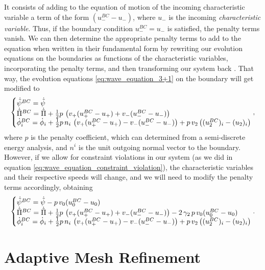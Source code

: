 It consists of adding to the equation of motion of the incoming characteristic variable a term of the form $(u_-^{BC}  - u_-)$, where $u_-$ is the incoming \textit{characteristic variable}. Thus, if the boundary condition $u_-^{BC} = u_-$ is satisfied, the penalty terms vanish. We can then determine the appropriate penalty terms to add to the equation when written in their fundamental form by rewriting our evolution equations on the boundaries as functions of the characteristic variables, incorporating the penalty terms, and then transforming our system back \cite{Pseudospectral_method_for_gravitational_wave_collapse,Spectral_methods_for_the_wave_equation_in_second-order_form}. That way, the evolution equations \eqref{eq:wave_equation_3+1} on the boundary will get modified to
%
\begin{align}
    \left\{\begin{array}{@{}l@{}} 
\dot{\tilde{\psi}}^{BC} = \dot{\tilde{\psi}} \\
\dot{\tilde{\Pi}}^{BC} = \dot{\tilde{\Pi}} + \frac{1}{2} p \, \left( v_+(u_+^{BC}  - u_+) + v_- (u_-^{BC}  - u_-) \right) \\
\dot{\phi}_i^{BC} = \dot{\phi}_i + \frac{1}{2} p \, n_i \, \left( v_+(u_+^{BC}  - u_+) - v_- (u_-^{BC}  - u_-) \right)  + p \, v_2 \left((u_2^{BC})_i  - (u_2)_i \right) \\
\end{array}\right. ,
\end{align}
%
where $p$ is the penalty coefficient, which can determined from a semi-discrete energy analysis, and $n^i$ is the unit outgoing normal vector to the boundary. However, if we allow for constraint violations in our system (as we did in equation \eqref{eq:wave_equation_constraint_violation}), the characteristic variables and their respective speeds will change, and we will need to modify the penalty terms accordingly, obtaining
%
\begin{align}
    \left\{\begin{array}{@{}l@{}} 
\dot{\tilde{\psi}}^{BC} = \dot{\tilde{\psi}} - p \, v_0 (u_0^{BC}  - u_0)\\
\dot{\tilde{\Pi}}^{BC} = \dot{\tilde{\Pi}} + \frac{1}{2} p \, \left( v_+(u_+^{BC}  - u_+) + v_- (u_-^{BC}  - u_-) \right) - 2 \, \gamma_2 \, p \, v_0 (u_0^{BC}  - u_0)\\
\dot{\phi}_i^{BC} = \dot{\phi}_i + \frac{1}{2} p \, n_i \, \left( v_+(u_+^{BC}  - u_+) - v_- (u_-^{BC}  - u_-) \right)  + p \, v_2 \left((u_2^{BC})_i  - (u_2)_i \right) \\
\end{array}\right. .
\end{align}

\section{Adaptive Mesh Refinement}
\label{section:amr}